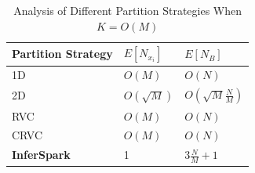 \begin{table}[h]
	\centering
	\caption{Analysis of Different Partition Strategies When $K = O(M)$}
	\label{tab:max_v_per_edge_part_OM}
	\begin{tabular}{lll}
		\hline
		Partition Strategy & $E[N_{x_i}]$ & $E[N_B]$\\\hline\hline
		1D & $O(M)$ & $O(N)$ \\\hline
		2D & $O(\sqrt{M})$ & $O(\sqrt{M}\frac{N}{M})$ \\\hline
		RVC & $O(M)$ & $O(N)$ \\\hline
		CRVC & $O(M)$ & $O(N)$ \\\hline
		{\bf InferSpark} & 1 & $3\frac{N}{M}+1$ \\\hline
	\end{tabular}
\end{table}

